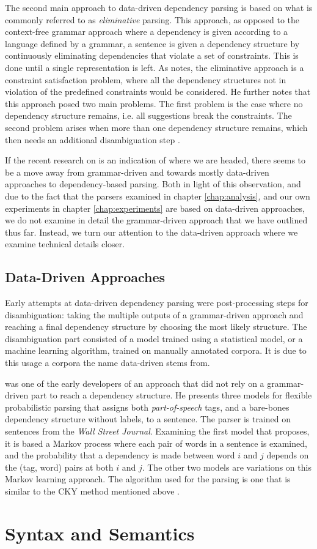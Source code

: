 The second main approach to data-driven dependency parsing is based on what is commonly referred to as \textit{eliminative} parsing. This approach, as opposed to the context-free grammar approach where a dependency is given according to a language defined by a grammar, a sentence is given a dependency structure by continuously eliminating dependencies that violate a set of constraints. This is done until a single representation is left. As \citeauthor{Niv:05} notes, the eliminative approach is a constraint satisfaction problem, where all the dependency structures not in violation of the predefined constraints would be considered. He further notes that this approach posed two main problems. The first problem is the case where no dependency structure remains, i.e. all suggestions break the constraints. The second problem arises when more than one dependency structure remains, which then needs an additional disambiguation step \cite{Niv:05}.

If the recent research on is an indication of where we are headed, there seems to be a move away from grammar-driven and towards mostly data-driven approaches to dependency-based parsing. Both in light of this observation, and due to the fact that the parsers examined in chapter \ref{chap:analysis}, and our own experiments in chapter \ref{chap:experiments} are based on data-driven approaches, we do not examine in detail the grammar-driven approach that we have outlined thus far. Instead, we turn our attention to the data-driven approach where we examine technical details closer.

\subsection{Data-Driven Approaches}
\label{data-driven}

Early attempts at data-driven dependency parsing were post-processing steps for disambiguation: taking the multiple outputs of a grammar-driven approach and reaching a final dependency structure by choosing the most likely structure. The disambiguation part consisted of a model trained using a statistical model, or a machine learning algorithm, trained on manually annotated corpora. It is due to this usage a corpora the name data-driven stems from.


\citeauthor{Eisner:96a} was one of the early developers of an approach that did not rely on a grammar-driven part to reach a dependency structure. He presents three models for flexible probabilistic parsing that assigns both \textit{part-of-speech} tags, and a bare-bones dependency structure without labels, to a sentence. The parser is trained on sentences from the \textit{Wall Street Journal}. Examining the first model that \citeauthor{Eisner:96a} proposes, it is based a Markov process where each pair of words in a sentence is examined, and the probability that a dependency is made between word $i$ and $j$ depends on the (tag, word) pairs at both $i$ and $j$. The other two models are variations on this Markov learning approach. The algorithm used for the parsing is one that is similar to the CKY method mentioned above \cite{Eisner:96a}.


\section{Syntax and Semantics}
\label{syntactic-semantic}